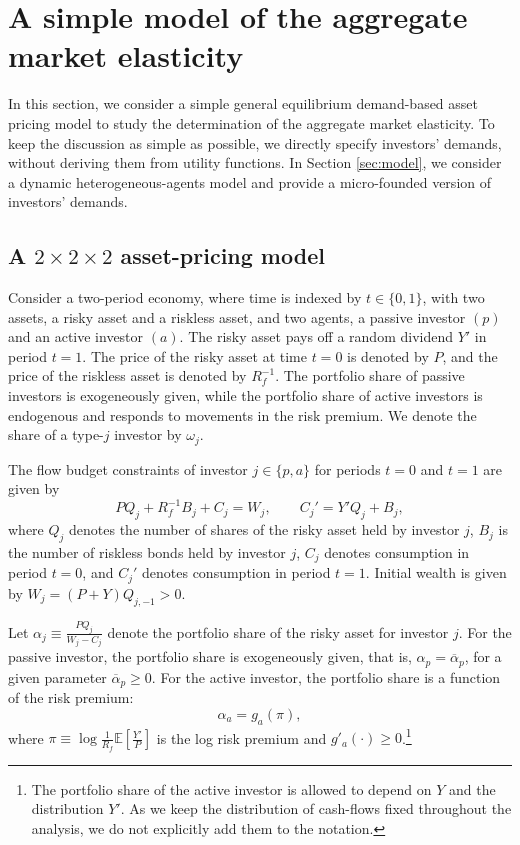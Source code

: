 \section{A simple model of the aggregate market elasticity}\label{sec:simple}

In this section, we consider a simple general equilibrium demand-based asset pricing model to study the determination of the aggregate market elasticity. 
To keep the discussion as simple as possible, we directly specify investors' demands, without deriving them from utility functions. 
In Section \ref{sec:model}, we consider a dynamic heterogeneous-agents model and provide a micro-founded version of investors' demands.

\subsection{A $2\times 2 \times 2$ asset-pricing model }

Consider a two-period economy, where time is indexed by $t \in \{ 0,1\}$, with two assets, a risky asset and a riskless asset, and two agents, a passive investor $(p)$ and an active investor $(a)$. 
The risky asset pays off a random dividend $Y'$ in period $t = 1$. 
The price of the risky asset at time $t = 0$ is denoted by  $P$, and the price of the riskless asset is denoted by $R_f^{-1}$.
The portfolio share of passive investors is exogeneously given, while the portfolio share of active investors is endogenous and responds to movements in the risk premium. 
We denote the share of a type-$j$ investor by $\omega_j$.

The flow budget constraints of investor $j \in \{p,a\}$ for periods $t=0$ and $t=1$ are given by 
\begin{equation}
    P Q_j + R_f^{-1} B_j + C_j = W_j, \qquad C_j' = Y' Q_j + B_j,\nonumber
\end{equation}
where $Q_j$ denotes the number of shares of the risky asset held by investor $j$, $B_j$ is the number of riskless bonds held by investor $j$, $C_j$ denotes consumption in period $t = 0$, and $C_j'$ denotes consumption in period $t = 1$. 
Initial wealth is given by $W_j = (P+Y) Q_{j,-1} > 0$.

Let $\alpha_j \equiv \frac{P Q_j}{W_j - C_j}$ denote the portfolio share of the risky asset for investor $j$. 
For the passive investor, the portfolio share is exogeneously given, that is, $\alpha_p = \overline{\alpha}_p$, for a given parameter $\overline{\alpha}_p \geq 0$.
For the active investor, the portfolio share is a function of the risk premium:
\begin{equation}
    \alpha_a = g_{a}(\pi),\nonumber
\end{equation}
where $\pi \equiv \log \frac{1}{R_f}\mathbb{E}[\frac{Y'}{P}]$ is the log risk premium and $g'_a(\cdot) \geq 0$.\footnote{The portfolio share of the active investor is allowed to depend on $Y$ and the distribution $Y'$. As we keep the distribution of cash-flows fixed throughout the analysis, we do not explicitly add them to the notation.}

